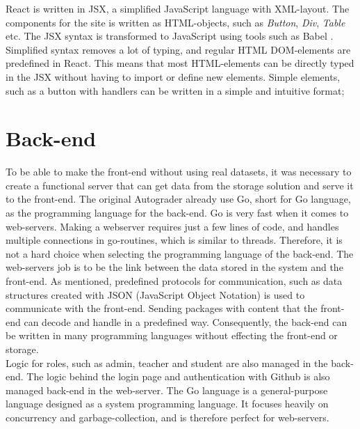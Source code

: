 React is written in JSX, a simplified JavaScript language with XML-layout. The components for the site is written as HTML-objects, such as \emph{Button}, \emph{Div}, \emph{Table} etc. The JSX syntax is transformed to JavaScript using tools such as Babel . Simplified syntax removes a lot of typing, and regular HTML DOM-elements are predefined in React. This means that most HTML-elements can be directly typed in the JSX without having to import or define new elements. Simple elements, such as a button with handlers can be written in a simple and intuitive format;






\section{Back-end}
To be able to make the front-end without using real datasets, it was necessary to create a functional server that can get data from the storage solution and serve it to the front-end. The original Autograder already use Go, short for Go language, as the programming language for the back-end. Go is very fast when it comes to web-servers. Making a webserver requires just a few lines of code, and handles multiple connections in go-routines, which is similar to threads. Therefore, it is not a hard choice when selecting the programming language of the back-end. The web-servers job is to be the link between the data stored in the system and the front-end. As mentioned, predefined protocols for communication, such as data structures created with JSON (JavaScript Object Notation) is used to communicate with the front-end. Sending packages with content that the front-end can decode and handle in a predefined way. Consequently, the back-end can be written in many programming languages without effecting the front-end or storage. \\Logic for roles, such as admin, teacher and student are also managed in the back-end. The logic behind the login page and authentication with Github is also managed back-end in the web-server. The Go language is a general-purpose language designed as a system programming language. It focuses heavily on concurrency and garbage-collection, and is therefore perfect for web-servers.


